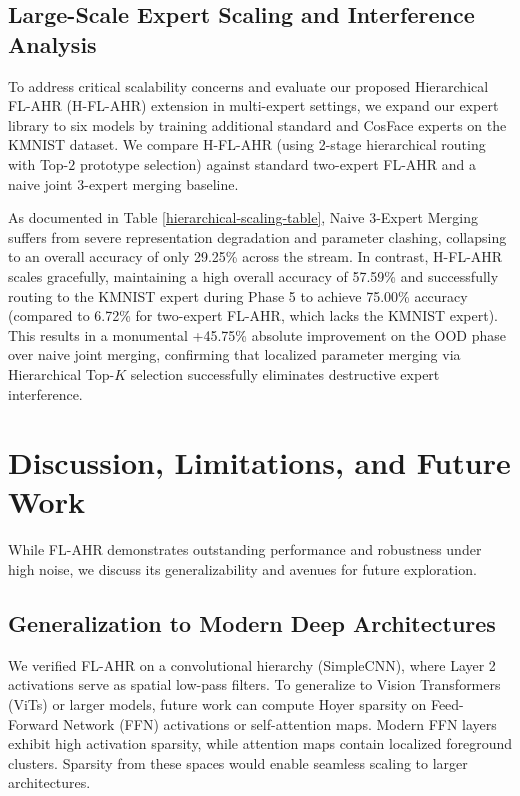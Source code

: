 \documentclass{article}
\theoremstyle{plain}
\theoremstyle{definition}
\theoremstyle{remark}
\begin{document}
\subsection{Large-Scale Expert Scaling and Interference Analysis}
To address critical scalability concerns and evaluate our proposed Hierarchical FL-AHR (H-FL-AHR) extension in multi-expert settings, we expand our expert library to six models by training additional standard and CosFace experts on the KMNIST dataset. We compare H-FL-AHR (using 2-stage hierarchical routing with Top-$2$ prototype selection) against standard two-expert FL-AHR and a naive joint 3-expert merging baseline. 

As documented in Table \ref{hierarchical-scaling-table}, Naive 3-Expert Merging suffers from severe representation degradation and parameter clashing, collapsing to an overall accuracy of only 29.25\% across the stream. In contrast, H-FL-AHR scales gracefully, maintaining a high overall accuracy of 57.59\% and successfully routing to the KMNIST expert during Phase 5 to achieve 75.00\% accuracy (compared to 6.72\% for two-expert FL-AHR, which lacks the KMNIST expert). This results in a monumental +45.75\% absolute improvement on the OOD phase over naive joint merging, confirming that localized parameter merging via Hierarchical Top-$K$ selection successfully eliminates destructive expert interference.

\section{Discussion, Limitations, and Future Work}
\label{submission-discussion}

While FL-AHR demonstrates outstanding performance and robustness under high noise, we discuss its generalizability and avenues for future exploration.

\subsection{Generalization to Modern Deep Architectures}
We verified FL-AHR on a convolutional hierarchy (SimpleCNN), where Layer 2 activations serve as spatial low-pass filters. To generalize to Vision Transformers (ViTs) or larger models, future work can compute Hoyer sparsity on Feed-Forward Network (FFN) activations or self-attention maps. Modern FFN layers exhibit high activation sparsity, while attention maps contain localized foreground clusters. Sparsity from these spaces would enable seamless scaling to larger architectures.
\end{document}
